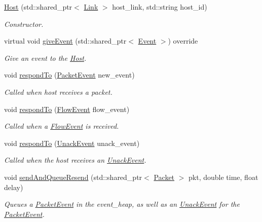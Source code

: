 \begin{DoxyCompactItemize}
\item 
\hyperlink{classHost_afde96dd6239594d91697006a850bea5b}{\-Host} (std\-::shared\-\_\-ptr$<$ \hyperlink{classLink}{\-Link} $>$ host\-\_\-link, std\-::string host\-\_\-id)
\begin{DoxyCompactList}\small\item\em \-Constructor. \end{DoxyCompactList}\item 
virtual void \hyperlink{classHost_a658a8bee30dfb9e6ff7abc26620f88ff}{give\-Event} (std\-::shared\-\_\-ptr$<$ \hyperlink{classEvent}{\-Event} $>$) override
\begin{DoxyCompactList}\small\item\em \-Give an event to the \hyperlink{classHost}{\-Host}. \end{DoxyCompactList}\item 
void \hyperlink{classHost_a1386df4e48df0cf8e7252c55fa9e0f2b}{respond\-To} (\hyperlink{classPacketEvent}{\-Packet\-Event} new\-\_\-event)
\begin{DoxyCompactList}\small\item\em \-Called when host receives a packet. \end{DoxyCompactList}\item 
void \hyperlink{classHost_a15013b657e880635a087ce41d9bccaf8}{respond\-To} (\hyperlink{classFlowEvent}{\-Flow\-Event} flow\-\_\-event)
\begin{DoxyCompactList}\small\item\em \-Called when a \hyperlink{classFlowEvent}{\-Flow\-Event} is received. \end{DoxyCompactList}\item 
void \hyperlink{classHost_af19765406b0fc694ec4122ef57d3bbb3}{respond\-To} (\hyperlink{classUnackEvent}{\-Unack\-Event} unack\-\_\-event)
\begin{DoxyCompactList}\small\item\em \-Called when the host receives an \hyperlink{classUnackEvent}{\-Unack\-Event}. \end{DoxyCompactList}\item 
void \hyperlink{classHost_a029c7f389a580fc7e53da38a698d0d9a}{send\-And\-Queue\-Resend} (std\-::shared\-\_\-ptr$<$ \hyperlink{classPacket}{\-Packet} $>$ pkt, double time, float delay)
\begin{DoxyCompactList}\small\item\em \-Queues a \hyperlink{classPacketEvent}{\-Packet\-Event} in the event\-\_\-heap, as well as an \hyperlink{classUnackEvent}{\-Unack\-Event} for the \hyperlink{classPacketEvent}{\-Packet\-Event}. \end{DoxyCompactList}\item 

\end{DoxyCompactItemize}
